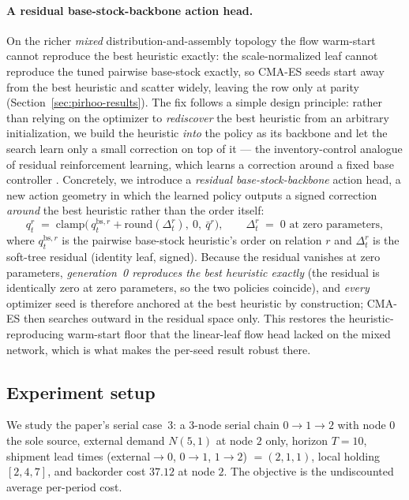 \documentclass[11pt]{article}
\begin{document}
\paragraph{A residual base-stock-backbone action head.}
On the richer \emph{mixed} distribution-and-assembly topology the flow warm-start cannot reproduce the best heuristic exactly:
the scale-normalized leaf cannot reproduce the tuned pairwise base-stock exactly, so CMA-ES seeds
start away from the best heuristic and scatter widely, leaving the row only at parity (Section~\ref{sec:pirhoo-results}). The
fix follows a simple design principle: rather than relying on the optimizer to \emph{rediscover} the
best heuristic from an arbitrary initialization, we build the heuristic \emph{into} the policy as its backbone and let
the search learn only a small correction on top of it --- the inventory-control analogue of residual
reinforcement learning, which learns a correction around a fixed base controller \citep{johannink2019residualrl}.
Concretely, we introduce a \emph{residual
base-stock-backbone} action head, a new action geometry in which the learned policy outputs a signed
correction \emph{around} the best heuristic rather than the order itself:
\begin{equation}
    \label{eq:residual-head}
    q^{r}_t \;=\; \mathrm{clamp}\!\bigl(\,q^{\mathrm{bs},r}_t + \mathrm{round}(\Delta^{r}_t),\ 0,\ \bar q^{r}\bigr),
    \qquad \Delta^{r}_t \;=\; 0 \text{ at zero parameters},
\end{equation}
where $q^{\mathrm{bs},r}_t$ is the pairwise base-stock heuristic's order on relation $r$ and $\Delta^{r}_t$
is the soft-tree residual (identity leaf, signed). Because the residual vanishes at zero parameters,
\emph{generation~0 reproduces the best heuristic exactly} (the residual is identically zero at zero parameters, so the two policies coincide), and \emph{every}
optimizer seed is therefore anchored at the best heuristic by construction; CMA-ES then searches outward in the
residual space only. This restores the heuristic-reproducing warm-start floor that the linear-leaf flow head
lacked on the mixed network, which is what makes the per-seed result robust there.

\subsection{Experiment setup}
\label{sec:pirhoo-setup}

We study the paper's serial case~3: a 3-node serial chain
$0\!\to\!1\!\to\!2$ with node $0$ the sole source, external demand $N(5,1)$ at node $2$ only, horizon
$T=10$, shipment lead times (external$\to$0, $0\to1$, $1\to2$) $=(2,1,1)$, local holding $[2,4,7]$, and
backorder cost $37.12$ at node $2$. The objective is the undiscounted average per-period cost.
\end{document}
